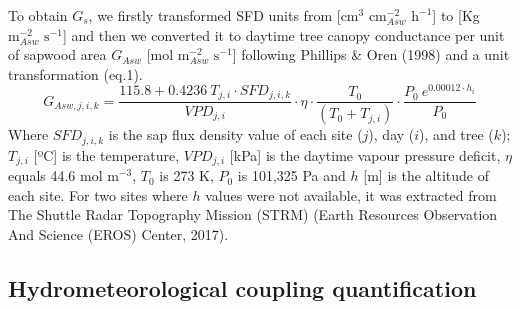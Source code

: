 \documentclass[11pt,twoside]{reedthesis}
\begin{document}
To obtain \(G_s\), we firstly transformed SFD units from
{[}\(\text{cm}^3\) \(\text{cm}^{-2}_{Asw}\) \(\text{h}^{-1}\){]} to
{[}Kg \(\text{m}^{-2}_{Asw}\) \(\text{s}^{-1}\){]} and then we converted
it to daytime tree canopy conductance per unit of sapwood area
\(G_{Asw}\) {[}mol \(\text{m}^{-2}_{Asw}\) \(\text{s}^{-1}\){]}
following Phillips \& Oren (1998) and a unit transformation (eq.1).
\begin{equation}
G_{Asw,j,i,k} = \frac{115.8 + 0.4236 \: T_{j , i} \cdot SFD_{j , i , k}}{VPD_{j,i}}\cdot \eta \cdot \frac{T_0}{(T_0 + T_{j,i})} \cdot \frac{P_0 \: e^{0.00012 \cdot h_i}}{P_0}
\end{equation}
Where \(SFD_{j,i,k}\) is the sap flux density value of each site
(\(j\)), day (\(i\)), and tree (\(k\)); \({T}_{j,i}\) {[}ºC{]} is the
temperature, \(VPD_{j,i}\) {[}kPa{]} is the daytime vapour pressure
deficit, \(\eta\) equals 44.6 mol \(\text{m}^{-3}\), \(T_0\) is 273 K,
\(P_0\) is 101,325 Pa and \(h\) {[}m{]} is the altitude of each site.
For two sites where \(h\) values were not available, it was extracted
from The Shuttle Radar Topography Mission (STRM) (Earth Resources
Observation And Science (EROS) Center, 2017).\par

\subsection{Hydrometeorological coupling
quantification}\label{hydrometeorological-coupling-quantification}
\end{document}
